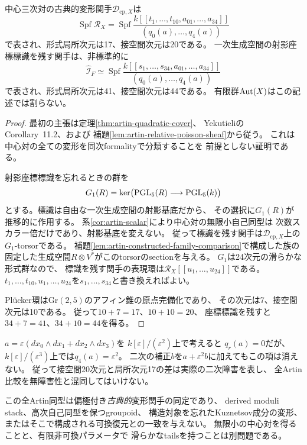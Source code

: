 \begin{theorem}[中心三次対の全Artin形式局所環]
\label{thm:artin-central-pair}
中心三次対の古典的変形関手$\mathcal D_{\mathrm{cp},X}$は
\[
 \operatorname{Spf}\mathcal R_X
 =\operatorname{Spf}\frac{
 k[[t_1,\ldots,t_{10},a_{01},\ldots,a_{34}]]
 }{(q_0(a),\ldots,q_4(a))}
\]
で表され、形式局所次元は17、接空間次元は20である。
一次生成空間の射影座標標識を残す関手は、非標準的に
\[
 \widehat{\mathcal I}_{F}\simeq
 \operatorname{Spf}\frac{
  k[[s_1,\ldots,s_{34},a_{01},\ldots,a_{34}]]
 }{(q_0(a),\ldots,q_4(a))}
\]
で表され、形式局所次元は41、接空間次元は44である。
有限群$\operatorname{Aut}(X)$はこの記述では割らない。
\end{theorem}
\begin{proof}
最初の主張は定理\ref{thm:artin-quadratic-cover}、
YekutieliのCorollary~11.2、および
補題\ref{lem:artin-relative-poisson-sheaf}から従う。
これは中心対の全ての変形を同次formalityで分類することを
前提としない証明である。

射影座標標識を忘れるときの群を
\[
 G_1(R)=\ker\bigl(\mathrm{PGL}_5(R)\longrightarrow\mathrm{PGL}_5(k)\bigr)
\]
とする。標識は自由な一次生成空間の射影基底だから、
その選択に$G_1(R)$が推移的に作用する。
系\ref{cor:artin-scalar}により中心対の無限小自己同型は
次数スカラー倍だけであり、射影基底を変えない。
従って標識を残す関手は$\mathcal D_{\mathrm{cp},X}$上の
$G_1$-torsorである。
補題\ref{lem:artin-constructed-family-comparison}で構成した族の
固定した生成空間$R\otimes V^*$がこのtorsorのsectionを与える。
$G_1$は24次元の滑らかな形式群なので、
標識を残す関手の表現環は$\mathcal R_X[[u_1,\ldots,u_{24}]]$である。
$t_1,\ldots,t_{10},u_1,\ldots,u_{24}$を$s_1,\ldots,s_{34}$と書き換えればよい。

Pl\"ucker環は$\mathrm{Gr}(2,5)$のアフィン錐の原点完備化であり、
その次元は7、接空間次元は10である。
従って$10+7=17$、$10+10=20$、
座標標識を残すと$34+7=41$、$34+10=44$を得る。
\end{proof}

\begin{remark}[一次方向はすべて二次へ延長するわけではない]
\label{rem:artin-obstruction}
$a=\varepsilon(dx_0\wedge dx_1+dx_2\wedge dx_3)$を
$k[\varepsilon]/(\varepsilon^2)$上で考えると
$q_r(a)=0$だが、
$k[\varepsilon]/(\varepsilon^3)$上では$q_4(a)=\varepsilon^2$。
二次の補正$b$を$a+\varepsilon^2b$に加えてもこの項は消えない。
従って接空間20次元と局所次元17の差は実際の二次障害を表し、
全Artin比較を無障害性と混同してはいけない。
\end{remark}

\begin{remark}[明確に主張しない事柄]
\label{rem:artin-limits}
この全Artin同型は偏極付き\emph{古典的}変形関手の同定であり、
derived moduli stack、高次自己同型を保つgroupoid、
構造対象を忘れたKuznetsov成分の変形、
またはそこで構成される可換復元との一致を与えない。
無限小の中心対を得ることと、有限非可換パラメータで
滑らかなtailsを持つことは別問題である。
\end{remark}

